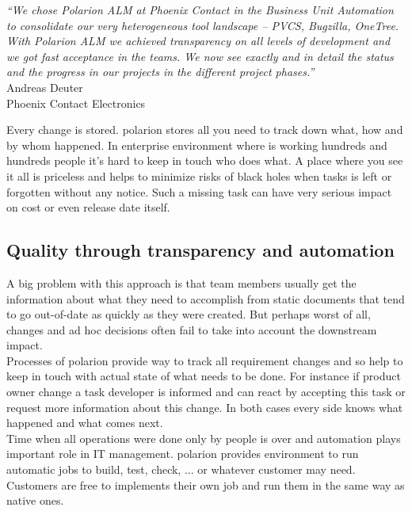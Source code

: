\documentclass[thesis=M,english]{FITthesis}[2012/06/26]
\begin{document}
\begin{center}
	\textit{“We chose Polarion ALM at Phoenix Contact
		in the Business Unit Automation to consolidate
		our very heterogeneous tool
		landscape – PVCS, Bugzilla, OneTree. With
		Polarion ALM we achieved transparency on
		all levels of development and we got fast
		acceptance in the teams. We now see exactly
		and in detail the status and the progress in
		our projects in the different project phases.”}\\
	Andreas Deuter\\
	Phoenix Contact Electronics\\
\end{center}

Every change is stored. \acrshort{polarion} stores all you need to track down what, how and by whom happened. In enterprise environment where is working hundreds and hundreds people it's hard to keep in touch who does what. A place where you see it all is priceless and helps to minimize risks of black holes when tasks is left or forgotten without any notice. Such a missing task can have very serious impact on cost or even release date itself.  

\subsection{Quality through transparency and automation}

A big problem with this approach is that team members usually get the information about what they need to accomplish from static documents that tend to go out-of-date as quickly as they were created. But perhaps worst of all, changes and ad hoc decisions often fail to take into account the downstream impact.\\

Processes of \acrshort{polarion} provide way to track all requirement changes and so help to keep in touch with actual state of what needs to be done. For instance if product owner change a task developer is informed and can react by accepting this task or request more information about this change. In both cases every side knows what happened and what comes next.\\

Time when all operations were done only by people is over and automation plays important role in IT management. \acrshort{polarion} provides environment to run automatic jobs to build, test, check, ... or whatever customer may need. Customers are free to implements their own job and run them in the same way as native ones.
\end{document}
